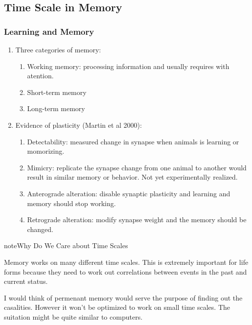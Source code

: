 \documentclass[letterpaper,10pt,english]{sphinxmanual}
\begin{document}
\subsection{Time Scale in Memory}
\label{\detokenize{neuroscience/memory/time-scale::doc}}\label{\detokenize{neuroscience/memory/time-scale:time-scale-in-memory}}

\subsubsection{Learning and Memory}
\label{\detokenize{neuroscience/memory/time-scale:learning-and-memory}}\begin{enumerate}
\item {} 
Three categories of memory: \label{\detokenize{neuroscience/memory/time-scale:id1}}{\hyperref[\detokenize{neuroscience/memory/time-scale:tetzlaff2012}]{\sphinxcrossref{{[}Tetzlaff2012{]}}}}
\begin{enumerate}
\item {} 
Working memory: processing information and usually requires with atention.

\item {} 
Short-term memory

\item {} 
Long-term memory

\end{enumerate}

\item {} 
Evidence of plasticity (Martin et al 2000):
\begin{enumerate}
\item {} 
Detectability: measured change in synapse when animals is learning or momorizing.

\item {} 
Mimicry: replicate the synapse change from one animal to another would result in similar memory or behavior. Not yet experimentally realized.

\item {} 
Anterograde alteration: disable synaptic plasticity and learning and memory should stop working.

\item {} 
Retrograde alteration: modify synapse weight and the memory should be changed.

\end{enumerate}

\end{enumerate}

\begin{sphinxadmonition}{note}{Why Do We Care about Time Scales}

Memory works on many different time scales. This is extremely important for life forms because they need to work out correlations between events in the past and current status.

I would think of permenant memory would serve the purpose of finding out the casalities. However it won’t be optimized to work on small time scales. The suitation might be quite similar to computers.
\end{sphinxadmonition}
\end{document}
